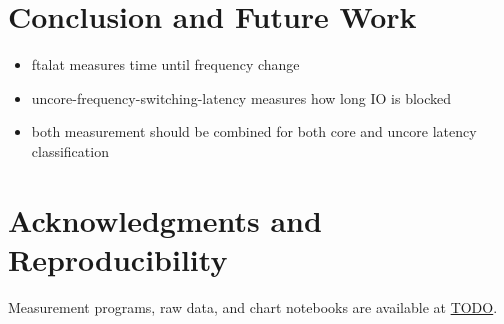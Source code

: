 \chapter{Conclusion and Future Work}
\label{sec:summary}

\begin{itemize}
    \item ftalat measures time until frequency change
    \item uncore-frequency-switching-latency measures how long IO is blocked
    \item both measurement should be combined for both core and uncore latency classification
\end{itemize}

\chapter*{Acknowledgments and Reproducibility}
Measurement programs, raw data, and chart notebooks are available at \url{TODO}.